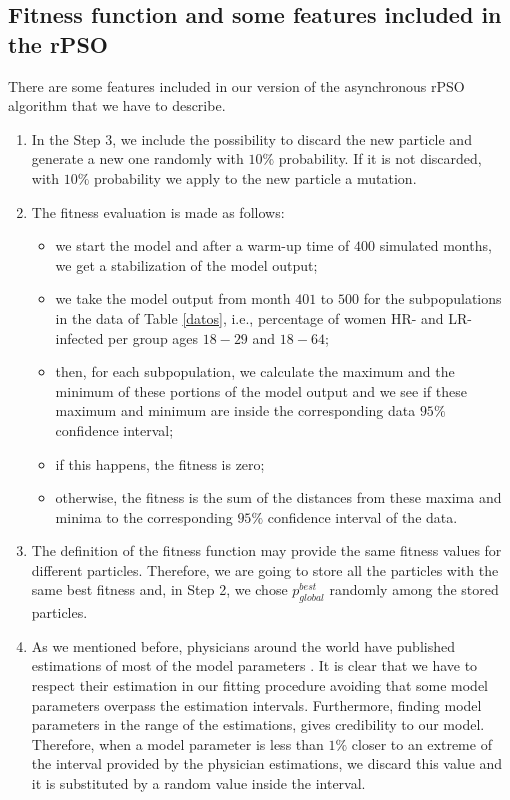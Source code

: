 \subsection{Fitness function and some features included in the rPSO}\label{sec:rPSO}
There are some features included in our version of the asynchronous rPSO algorithm that we have to describe. 

\begin{enumerate}
	\item In the Step 3, we include the possibility to discard the new particle and generate a new one randomly with $10\%$ probability. If it is not discarded, with $10\%$ probability we apply to the new particle a mutation.  
	\item The fitness evaluation is made as follows: 
	\begin{itemize}
		\item we start the model and after a warm-up time of $ 400 $ simulated months, we get a stabilization of the model output; 
		\item we take the model output from month $ 401 $ to $ 500 $ for the subpopulations in the data of Table \ref{datos}, i.e., percentage of women HR- and LR-infected per group ages $18-29$ and $18-64$;  
		\item then, for each subpopulation, we calculate the maximum and the minimum of these portions of the model output and we see if these maximum and minimum are inside the corresponding data $95\%$ confidence interval;
		\item if this happens, the fitness is zero; 
		\item otherwise, the fitness is the sum of the distances from these maxima and minima to the corresponding $95\%$ confidence interval of the data.
	\end{itemize}
	
	\item The definition of the fitness function may provide the same fitness values for different particles. Therefore, we are going to store all the particles with the same best fitness and, in Step 2, we chose  $p_{global}^{best}$ randomly among the stored particles.	
	\item As we mentioned before, physicians around the world have published estimations of most of the model parameters \cite{Durex2002,elbasha2007model,Giuliano2011,Nyitray2015}. It is clear that we have to respect their estimation in our fitting procedure avoiding that some model parameters overpass the estimation intervals. Furthermore, finding model parameters in the range of the estimations, gives credibility to our model. Therefore, when a model parameter is less than $1\%$ closer to an extreme of the interval provided by the physician estimations, we discard this value and it is substituted by a random value inside the interval.  
\end{enumerate}

